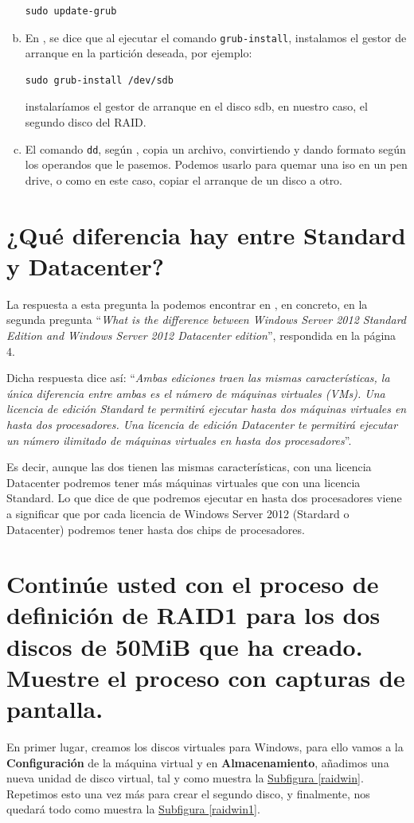 \documentclass[10pt,a4paper,spanish]{article}
\numberwithin{equation}{section} %
\numberwithin{figure}{section} %
\numberwithin{table}{section} %
\begin{document}
\begin{enumerate}[a)]
\begin{verbatim}
sudo update-grub
\end{verbatim}

\item En \cite{mangrub}, se dice que al ejecutar el comando \texttt{grub-install}, instalamos el gestor de arranque en la partición deseada, por ejemplo:

\begin{verbatim}
sudo grub-install /dev/sdb
\end{verbatim}

instalaríamos el gestor de arranque en el disco sdb, en nuestro caso, el segundo disco del RAID.

\item El comando \texttt{dd}, según \cite{mandd}, copia un archivo, convirtiendo y dando formato según los operandos que le pasemos. Podemos usarlo para quemar una iso en un pen drive, o como en este caso, copiar el arranque de un disco a otro.
\end{enumerate}

\section{¿Qué diferencia hay entre Standard y Datacenter?}
La respuesta a esta pregunta la podemos encontrar en \cite{ws2012}, en concreto, en la segunda pregunta ``\textit{What is the difference between Windows Server 2012 Standard Edition and Windows Server 2012 Datacenter edition}'', respondida en la página 4. 

Dicha respuesta dice así: ``\textit{Ambas ediciones traen las mismas características, la única diferencia entre ambas es el número de máquinas virtuales (VMs). Una licencia de edición Standard te permitirá ejecutar hasta dos máquinas virtuales en hasta dos procesadores. Una licencia de edición Datacenter te permitirá ejecutar un número ilimitado de máquinas virtuales en hasta dos procesadores}''.

Es decir, aunque las dos tienen las mismas características, con una licencia Datacenter podremos tener más máquinas virtuales que con una licencia Standard. Lo que dice de que podremos ejecutar en hasta dos procesadores viene a significar que por cada licencia de Windows Server 2012 (Stardard o Datacenter) podremos tener hasta dos chips de procesadores.

\section{Continúe usted con el proceso de definición de RAID1 para los dos discos de 50MiB que ha creado. Muestre el proceso con capturas de pantalla.}
En primer lugar, creamos los discos virtuales para Windows, para ello vamos a la \textbf{Configuración} de la máquina virtual y en \textbf{Almacenamiento}, añadimos una nueva unidad de disco virtual, tal y como muestra la \hyperref[raidwin]{Subfigura \ref*{raidwin}}. Repetimos esto una vez más para crear el segundo disco, y finalmente, nos quedará todo como muestra la \hyperref[raidwin1]{Subfigura \ref*{raidwin1}}.
\end{document}
